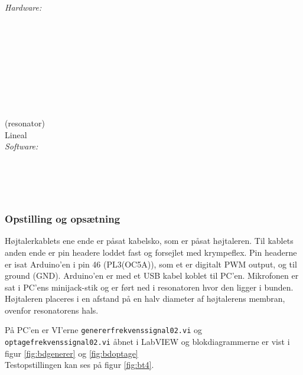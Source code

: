 		\textit{Hardware:}\\
		\tores\\
		\hojtalerkabel\\
		\kabelsko\\
		\pins\\
		\krympeflex\\
		\arduino\\
		\mikrofon\\
		\PC\\
		\usbkabel\\
		 (resonator)\\
		Lineal\\
	
		\textit{Software:}\\
		\labview\\
		\visa\\
		\vi\\
		\ardsw\\
		
		
		\subsubsection{Opstilling og opsætning}
		
		Højtalerkablets ene ende er påsat kabelsko, som er påsat højtaleren. Til kablets anden ende er pin headere loddet fast og forsejlet med krympeflex. Pin headerne er isat Arduino'en i pin 46 (PL3(OC5A)), som et er digitalt PWM output, og til ground (GND). 
		Arduino'en er med et USB kabel koblet til PC'en.	
		Mikrofonen er sat i PC'ens minijack-stik og er ført ned i resonatoren hvor den ligger i bunden. Højtaleren placeres i en afstand på en halv diameter af højtalerens membran, ovenfor resonatorens hals. 
		
		På PC'en er VI'erne \texttt{genererfrekvenssignal02.vi} og \texttt{optagefrekvenssignal02.vi} åbnet i LabVIEW og blokdiagrammerne er vist i figur \ref{fig:bdgenerer} og \ref{fig:bdoptage} \\ Testopstillingen kan ses på figur \ref{fig:bt4}.  
		
